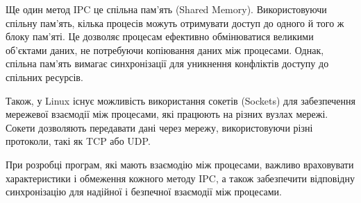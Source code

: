 \documentclass[a4paper,12pt]{article}
\begin{document}
    Ще один метод IPC це спільна пам'ять (Shared Memory). Використовуючи спільну пам'ять, кілька процесів можуть отримувати доступ до одного й того ж блоку пам'яті.
    Це дозволяє процесам ефективно обмінюватися великими об'єктами даних, не потребуючи копіювання даних між процесами. 
    Однак, спільна пам'ять вимагає синхронізації для уникнення конфліктів доступу до спільних ресурсів.

    Також, у Linux існує можливість використання сокетів (Sockets) для забезпечення мережевої взаємодії між процесами, які працюють на різних вузлах мережі.
    Сокети дозволяють передавати дані через мережу, використовуючи різні протоколи, такі як TCP або UDP.

    При розробці програм, які мають взаємодію між процесами, важливо враховувати характеристики і обмеження кожного методу IPC, а також забезпечити відповідну 
    синхронізацію для надійної і безпечної взаємодії між процесами.
\end{document}
